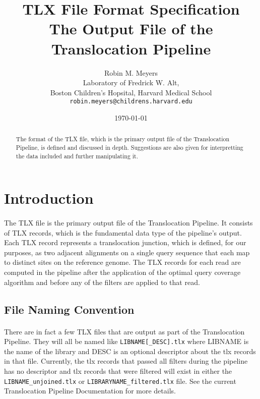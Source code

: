 \documentclass{article}
\begin{document}
\title{TLX File Format Specification \\ \large The Output File of the Translocation Pipeline}
\author{Robin M. Meyers\\
  Laboratory of Fredrick W. Alt,\\
  Boston Children's Hopsital, Harvard Medical School\\
  \texttt{robin.meyers@childrens.harvard.edu}}
\date{\today}
\maketitle

\begin{abstract}
The format of the TLX file, which is the primary output file of the Translocation Pipeline, is defined and discussed in depth. Suggestions are also given for interpretting the data included and further manipulating it. 
\end{abstract}

\section{Introduction}
\paragraph{} The TLX file is the primary output file of the Translocation Pipeline. It consists of TLX records, which is the fundamental data type of the pipeline's output. Each TLX record represents a translocation junction, which is defined, for our purposes, as two adjacent alignments on a single query sequence that each map to distinct sites on the reference genome. The TLX records for each read are computed in the pipeline after the application of the optimal query coverage algorithm and before any of the filters are applied to that read. 

\subsection*{File Naming Convention}
\paragraph{} There are in fact a few TLX files that are output as part of the Translocation Pipeline. They will all be named like \texttt{LIBNAME[\_DESC].tlx} where LIBNAME is the name of the library and DESC is an optional descriptor about the tlx records in that file. Currently, the tlx records that passed all filters during the pipeline has no descriptor and tlx records that were filtered will exist in either the \texttt{LIBNAME\_unjoined.tlx} or \texttt{LIBRARYNAME\_filtered.tlx} file. See the current Translocation Pipeline Documentation for more details.
\end{document}
